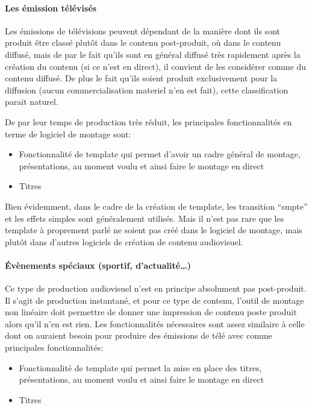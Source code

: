 \paragraph {Les émission télévisés}
Les émissions de télévisions peuvent dépendant de la manière dont ils sont produit être
classé plutôt dans le contenu post-produit, où dans le contenu diffusé, mais de par le
fait qu'ils sont en général diffusé très rapidement après la création du contenu (si ce n'est en
direct), il convient de les considérer comme du contenu diffusé. De plus le fait qu'ils soient
produit exclusivement pour la diffusion (aucun commercialisation materiel n'en est fait), cette
classification parait naturel.

De par leur temps de production très réduit, les principales fonctionnalités en terme de logiciel
de montage sont:
\begin{itemize}
  \item{Fonctionnalité de template qui permet d'avoir un cadre général de montage,
    présentations, au moment voulu et ainsi faire le montage en direct}
  \item{Titres}
\end{itemize}

Bien évidemment, dans le cadre de la création de template, les transition ``smpte'' et les effets simples
sont généralement utilisés. Mais il n'est pas rare que les template à proprement parlé ne soient pas créé
dans le logiciel de montage, mais plutôt dans d'autres logiciels de création de contenu audiovisuel.

\paragraph {Évènements spéciaux (sportif, d'actualité\ldots)}
Ce type de production audiovisuel n'est en principe absolument pas post-produit. Il
s'agit de production instantané, et pour ce type de contenu, l'outil de montage non
linéaire doit permettre de donner une impression de contenu poste produit alors
qu'il n'en est rien. Les fonctionnalités nécessaires sont assez similaire
à celle dont on auraient besoin pour produire des émissions de télé avec comme principales
fonctionnalités:
\begin{itemize}
  \item{Fonctionnalité de template qui permet la mise en place des titres,
    présentations, au moment voulu et ainsi faire le montage en direct}
  \item{Titres}
\end{itemize}

